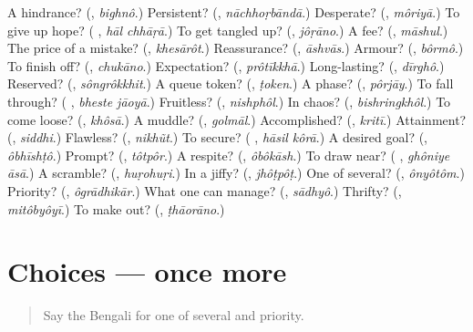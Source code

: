 \begin{tcolorbox}[breakable,colback=teal!4,colframe=teal!35!black,title={Before you move on}]
A hindrance? (\textbf{}, \emph{bighnô}.) Persistent? (\textbf{}, \emph{nāchhoṛbāndā}.) Desperate? (\textbf{}, \emph{môriyā}.) To give up hope? (\textbf{ }, \emph{hāl chhāṛā}.) To get tangled up? (\textbf{}, \emph{jôṛāno}.) A fee? (\textbf{}, \emph{māshul}.) The price of a mistake? (\textbf{}, \emph{khesārôt}.) Reassurance? (\textbf{}, \emph{āshvās}.) Armour? (\textbf{}, \emph{bôrmô}.) To finish off? (\textbf{}, \emph{chukāno}.) Expectation? (\textbf{}, \emph{prôtīkkhā}.) Long-lasting? (\textbf{}, \emph{dīrghô}.) Reserved? (\textbf{}, \emph{sôngrôkkhit}.) A queue token? (\textbf{}, \emph{ṭoken}.) A phase? (\textbf{}, \emph{pôrjāy}.) To fall through? (\textbf{ }, \emph{bheste jāoyā}.) Fruitless? (\textbf{}, \emph{nishphôl}.) In chaos? (\textbf{}, \emph{bishringkhôl}.) To come loose? (\textbf{}, \emph{khôsā}.) A muddle? (\textbf{}, \emph{golmāl}.) Accomplished? (\textbf{}, \emph{kritī}.) Attainment? (\textbf{}, \emph{siddhi}.) Flawless? (\textbf{}, \emph{nikhũt}.) To secure? (\textbf{ }, \emph{hāsil kôrā}.) A desired goal? (\textbf{}, \emph{ôbhīshṭô}.) Prompt? (\textbf{}, \emph{tôtpôr}.) A respite? (\textbf{}, \emph{ôbôkāsh}.) To draw near? (\textbf{ }, \emph{ghôniye āsā}.) A scramble? (\textbf{}, \emph{huṛohuṛi}.) In a jiffy? (\textbf{}, \emph{jhôṭpôṭ}.) One of several? (\textbf{}, \emph{ônyôtôm}.) Priority? (\textbf{}, \emph{ôgrādhikār}.) What one can manage? (\textbf{}, \emph{sādhyô}.) Thrifty? (\textbf{}, \emph{mitôbyôyī}.) To make out? (\textbf{}, \emph{ṭhāorāno}.)
\end{tcolorbox}
\section[(dialogue)]{Choices — once more}

\label{lesson:BN-R545-review-final-545}



\begin{quote}
Say the Bengali for one of several and priority.
\end{quote}

